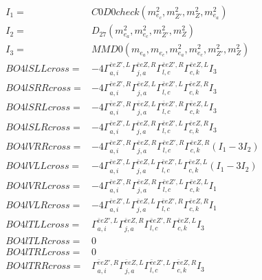 \documentclass[A4,landscape]{article}
\begin{document}
\begin{align} 
I_1 = & C0D0check(m^2_{e_{{c}}}, m^2_{{Z'}}, m^2_{Z}, m^2_{e_{{a}}}) \\ 
I_2 = & D_{27}(m^2_{e_{{a}}}, m^2_{e_{{c}}}, m^2_{{Z'}}, m^2_{Z}) \\ 
I_3 = & MMD0(m_{e_{{a}}}, m_{e_{{c}}}, m^2_{e_{{a}}}, m^2_{e_{{c}}}, m^2_{{Z'}}, m^2_{Z}) \\ 
  BO4lSLLcross= & -4  \Gamma^{\bar{e}e {Z'} ,L}_{a, i} \Gamma^{\bar{e}e Z ,R}_{j, a} \Gamma^{\bar{e}e {Z'} ,R}_{l, c} \Gamma^{\bar{e}e Z ,L}_{c, k} I_3 \\ 
  BO4lSRRcross= & -4  \Gamma^{\bar{e}e {Z'} ,R}_{a, i} \Gamma^{\bar{e}e Z ,L}_{j, a} \Gamma^{\bar{e}e {Z'} ,L}_{l, c} \Gamma^{\bar{e}e Z ,R}_{c, k} I_3 \\ 
  BO4lSRLcross= & -4  \Gamma^{\bar{e}e {Z'} ,R}_{a, i} \Gamma^{\bar{e}e Z ,L}_{j, a} \Gamma^{\bar{e}e {Z'} ,R}_{l, c} \Gamma^{\bar{e}e Z ,L}_{c, k} I_3 \\ 
  BO4lSLRcross= & -4  \Gamma^{\bar{e}e {Z'} ,L}_{a, i} \Gamma^{\bar{e}e Z ,R}_{j, a} \Gamma^{\bar{e}e {Z'} ,L}_{l, c} \Gamma^{\bar{e}e Z ,R}_{c, k} I_3 \\ 
  BO4lVRRcross= & -4  \Gamma^{\bar{e}e {Z'} ,R}_{a, i} \Gamma^{\bar{e}e Z ,R}_{j, a} \Gamma^{\bar{e}e {Z'} ,R}_{l, c} \Gamma^{\bar{e}e Z ,R}_{c, k} (I_1 - 3 I_2) \\ 
  BO4lVLLcross= & -4  \Gamma^{\bar{e}e {Z'} ,L}_{a, i} \Gamma^{\bar{e}e Z ,L}_{j, a} \Gamma^{\bar{e}e {Z'} ,L}_{l, c} \Gamma^{\bar{e}e Z ,L}_{c, k} (I_1 - 3 I_2) \\ 
  BO4lVRLcross= & -4  \Gamma^{\bar{e}e {Z'} ,R}_{a, i} \Gamma^{\bar{e}e Z ,R}_{j, a} \Gamma^{\bar{e}e {Z'} ,L}_{l, c} \Gamma^{\bar{e}e Z ,L}_{c, k} I_1 \\ 
  BO4lVLRcross= & -4  \Gamma^{\bar{e}e {Z'} ,L}_{a, i} \Gamma^{\bar{e}e Z ,L}_{j, a} \Gamma^{\bar{e}e {Z'} ,R}_{l, c} \Gamma^{\bar{e}e Z ,R}_{c, k} I_1 \\ 
  BO4lTLLcross= &  \Gamma^{\bar{e}e {Z'} ,L}_{a, i} \Gamma^{\bar{e}e Z ,R}_{j, a} \Gamma^{\bar{e}e {Z'} ,R}_{l, c} \Gamma^{\bar{e}e Z ,L}_{c, k} I_3 \\ 
  BO4lTLRcross= & 0 \\ 
  BO4lTRLcross= & 0 \\ 
  BO4lTRRcross= &  \Gamma^{\bar{e}e {Z'} ,R}_{a, i} \Gamma^{\bar{e}e Z ,L}_{j, a} \Gamma^{\bar{e}e {Z'} ,L}_{l, c} \Gamma^{\bar{e}e Z ,R}_{c, k} I_3 \\ 
\end{align} 
\end{document}
